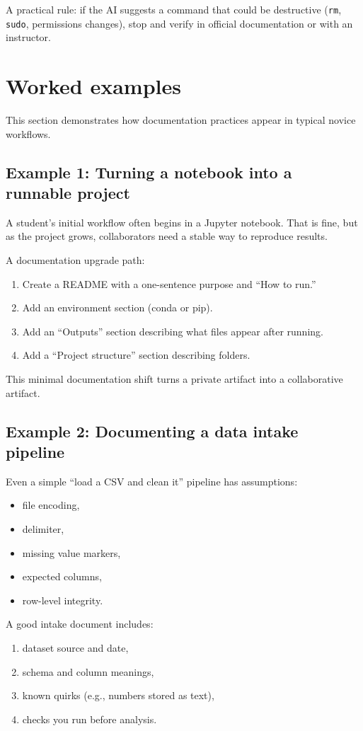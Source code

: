 A practical rule: if the AI suggests a command that could be destructive (\texttt{rm}, \texttt{sudo}, permissions changes), stop and verify in official documentation or with an instructor.

\section{Worked examples}
This section demonstrates how documentation practices appear in typical novice workflows.

\subsection{Example 1: Turning a notebook into a runnable project}
A student’s initial workflow often begins in a Jupyter notebook. That is fine, but as the project grows, collaborators need a stable way to reproduce results.

A documentation upgrade path:
\begin{enumerate}[noitemsep]
  \item Create a README with a one-sentence purpose and “How to run.”
  \item Add an environment section (conda or pip).
  \item Add an “Outputs” section describing what files appear after running.
  \item Add a “Project structure” section describing folders.
\end{enumerate}

This minimal documentation shift turns a private artifact into a collaborative artifact.

\subsection{Example 2: Documenting a data intake pipeline}
Even a simple “load a CSV and clean it” pipeline has assumptions:
\begin{itemize}[noitemsep]
  \item file encoding,
  \item delimiter,
  \item missing value markers,
  \item expected columns,
  \item row-level integrity.
\end{itemize}

A good intake document includes:
\begin{enumerate}[noitemsep]
  \item dataset source and date,
  \item schema and column meanings,
  \item known quirks (e.g., numbers stored as text),
  \item checks you run before analysis.
\end{enumerate}

